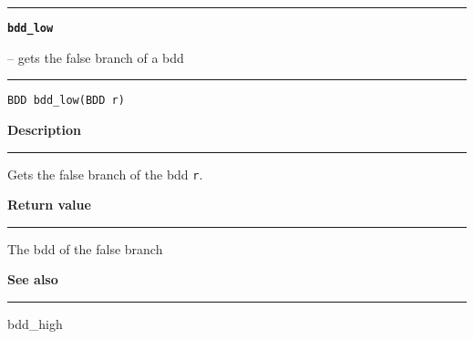 \vspace{8ex}
\begin{minipage}{\textwidth}

\noindent\begin{minipage}{\textwidth}
\rule{\textwidth}{0.5mm}
{\tt\bf bdd\_low }
\--- gets the false branch of a bdd   \hspace{\fill}
\\\rule[1.5ex]{\textwidth}{0.5mm}
\end{minipage}

\noindent\begin{verbatim}
BDD bdd_low(BDD r) 
\end{verbatim}

\vspace{\parsep}\noindent
{\bf Description}\\\rule[1.5ex]{\textwidth}{0.2mm}\vspace{-1.5ex}\setlength{\parindent}{1em}
Gets the false branch of the bdd {\tt r}.  

\setlength{\parindent}{0em}\vspace{\parsep}\vspace{\baselineskip}\noindent
{\bf Return value}\\\rule[1.5ex]{\textwidth}{0.2mm}\vspace{-1.5ex}
The bdd of the false branch 

\vspace{\parsep}\vspace{\baselineskip}\noindent
{\bf See also}\\\rule[1.5ex]{\textwidth}{0.2mm}\vspace{-1.5ex}
bdd\_high 
\end{minipage}
\vspace{8ex}
